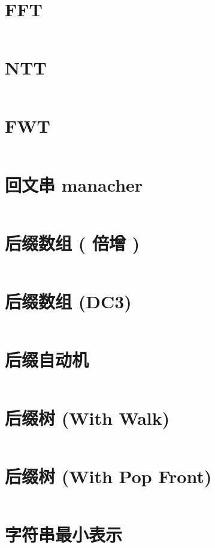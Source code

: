 \documentclass[titlepage,landscape,a4paper,10pt]{article}
\begin{document}
\begin{multicols}{2}
\begin{spacing}{0.8}
\section{FFT}
\inputminted{cpp}{improve/FFT.cpp}

\section{NTT}
\inputminted{cpp}{improve/NTT.cpp}

\section{FWT}
\inputminted{cpp}{improve/FWT.cpp}

\section{回文串 manacher}
\inputminted{cpp}{src/回文串manacher.cpp}

\section{后缀数组 ( 倍增 )}
\inputminted{cpp}{src/后缀数组(nlogn).cpp}

\section{后缀数组 (DC3)}
\inputminted{cpp}{src/DC3.cpp}

\section{后缀自动机}
\inputminted{cpp}{src/后缀自动机.cpp}

\section{后缀树 (With Walk)}
\inputminted{cpp}{improve/SuffixTree.cpp}

\section{后缀树 (With Pop Front)}
\inputminted{cpp}{improve/SuffixTree2.cpp}

\section{字符串最小表示}
\inputminted{cpp}{src/字符串最小表示.cpp}


\end{spacing}
\end{multicols}
\end{document}
